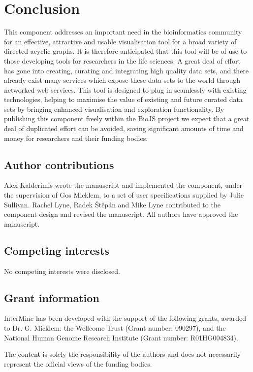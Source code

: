 \documentclass[10pt,a4paper,twocolumn]{article}
\begin{document}
\section*{Conclusion}
This component addresses an important need in the
bioinformatics community for an effective, attractive and usable visualisation
tool for a broad variety of directed acyclic graphs.  It is therefore
anticipated that this tool will be of use to those developing tools for
researchers in the life sciences. A great deal of effort has gone into creating,
curating and integrating high quality data sets, and there already exist many
services which expose these data-sets to the world through networked
web services. This tool is designed to plug in seamlessly with existing
technologies, helping to maximise the value of existing and future curated data
sets by bringing enhanced visualisation and exploration functionality.  By
publishing this component freely within the BioJS project we expect that a great
deal of duplicated effort can be avoided, saving significant amounts of time and
money for researchers and their funding bodies.

\subsection*{Author contributions}

Alex Kalderimis wrote the manuscript and implemented the component, under the
supervision of Gos Micklem, to a set of user specifications supplied by Julie
Sullivan. Rachel Lyne, Radek Štěpán and Mike Lyne contributed to the
component design and revised the manuscript. All authors have approved the
manuscript.

\subsection*{Competing interests}
No competing interests were disclosed.

\subsection*{Grant information}
InterMine has been developed with the support of the following grants, awarded
to Dr. G. Micklem: the Wellcome Trust (Grant number: 090297),
and the National Human Genome Research Institute (Grant number: R01HG004834).

The content is solely the responsibility of the authors and does not necessarily
represent the official views of the funding bodies.
\end{document}
